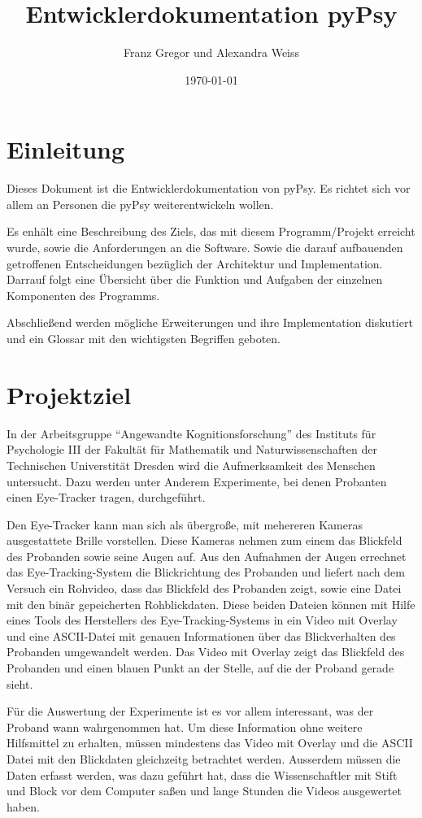 \documentclass[a4paper,draft]{scrartcl}
\title{Entwicklerdokumentation pyPsy}
\author{Franz Gregor und Alexandra Weiss}
\date{\today}
\begin{document}
\maketitle
\newpage
\tableofcontents
\newpage
\section{Einleitung}
Dieses Dokument ist die Entwicklerdokumentation von pyPsy.
Es richtet sich vor allem an Personen die pyPsy weiterentwickeln wollen.

Es enh\"alt eine Beschreibung des Ziels, das mit diesem Programm/Projekt erreicht wurde, sowie die Anforderungen an die Software.
Sowie die darauf aufbauenden getroffenen Entscheidungen bezüglich der Architektur und Implementation.
Darrauf folgt eine \"Ubersicht \"uber die Funktion und Aufgaben der einzelnen Komponenten des Programms.

Abschlie\ss end werden m\"ogliche Erweiterungen und ihre Implementation diskutiert und ein Glossar mit den wichtigsten Begriffen geboten.

\section{Projektziel}
In der Arbeitsgruppe "`Angewandte Kognitionsforschung"' des Instituts f\"ur Psychologie III der Fakult\"at f\"ur Mathematik und Naturwissenschaften der Technischen Universtit\"at Dresden wird die Aufmerksamkeit des Menschen untersucht.
Dazu werden unter Anderem Experimente, bei denen Probanten einen Eye-Tracker tragen, durchgef\"uhrt.

Den Eye-Tracker kann man sich als \"ubergroße, mit mehereren Kameras ausgestattete Brille vorstellen.
Diese Kameras nehmen zum einem das Blickfeld des Probanden sowie seine Augen auf.
Aus den Aufnahmen der Augen errechnet das Eye-Tracking-System die Blickrichtung des Probanden und liefert nach dem Versuch ein Rohvideo, dass das Blickfeld des Probanden zeigt, sowie eine Datei mit den bin\"ar gepeicherten Rohblickdaten.
Diese beiden Dateien k\"onnen mit Hilfe eines Tools des Herstellers des Eye-Tracking-Systems in ein Video mit Overlay und eine ASCII-Datei mit genauen Informationen \"uber das Blickverhalten des Probanden umgewandelt werden.
Das Video mit Overlay zeigt das Blickfeld des Probanden und einen blauen Punkt an der Stelle, auf die der Proband gerade sieht.

F\"ur die Auswertung der Experimente ist es vor allem interessant, was der Proband wann wahrgenommen hat.
Um diese Information ohne weitere Hilfsmittel zu erhalten, m\"ussen mindestens das Video mit Overlay und die ASCII Datei mit den Blickdaten gleichzeitg betrachtet werden.
Ausserdem m\"ussen die Daten erfasst werden, was dazu gef\"uhrt hat, dass die Wissenschaftler mit Stift und Block vor dem Computer sa\ss en und lange Stunden die Videos ausgewertet haben.
\end{document}
